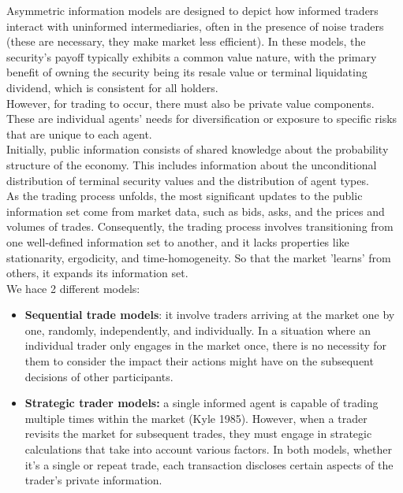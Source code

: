 Asymmetric information models are designed to depict how informed traders interact with uninformed intermediaries, often in the presence of noise traders (these are necessary, they make market less efficient). In these models, the security's payoff typically exhibits a common value nature, with the primary benefit of owning the security being its resale value or terminal liquidating dividend, which is consistent for all holders.\\
However, for trading to occur, there must also be private value components. These are individual agents' needs for diversification or exposure to specific risks that are unique to each agent.\\
Initially, public information consists of shared knowledge about the probability structure of the economy. This includes information about the unconditional distribution of terminal security values and the distribution of agent types.\\
As the trading process unfolds, the most significant updates to the public information set come from market data, such as bids, asks, and the prices and volumes of trades. Consequently, the trading process involves transitioning from one well-defined information set to another, and it lacks properties like stationarity, ergodicity, and time-homogeneity. So that the market 'learns' from others, it expands its information set.\\
We hace 2 different models:
\begin{itemize}
	\item \textbf{Sequential trade models}: it involve traders arriving at the market one by one, randomly, independently, and individually. In a situation where an individual trader only engages in the market once, there is no necessity for them to consider the impact their actions might have on the subsequent decisions of other participants.
	\item \textbf{Strategic trader models:}  a single informed agent is capable of trading multiple times within the market (Kyle 1985). However, when a trader revisits the market for subsequent trades, they must engage in strategic calculations that take into account various factors. In both models, whether it's a single or repeat trade, each transaction discloses certain aspects of the trader's private information.
\end{itemize}
